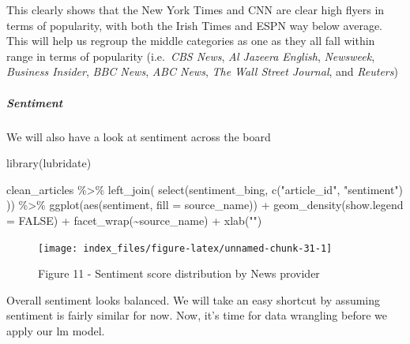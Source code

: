 \documentclass[
]{article}
\newenvironment{Shaded}{\begin{snugshade}}{\end{snugshade}}
\newcommand{\AttributeTok}[1]{\textcolor[rgb]{0.77,0.63,0.00}{#1}}
\newcommand{\ConstantTok}[1]{\textcolor[rgb]{0.00,0.00,0.00}{#1}}
\newcommand{\FunctionTok}[1]{\textcolor[rgb]{0.00,0.00,0.00}{#1}}
\newcommand{\NormalTok}[1]{#1}
\newcommand{\SpecialCharTok}[1]{\textcolor[rgb]{0.00,0.00,0.00}{#1}}
\newcommand{\StringTok}[1]{\textcolor[rgb]{0.31,0.60,0.02}{#1}}
\begin{document}
This clearly shows that the New York Times and CNN are clear high flyers
in terms of popularity, with both the Irish Times and ESPN way below
average. This will help us regroup the middle categories as one as they
all fall within range in terms of popularity (i.e.~\emph{CBS News},
\emph{Al Jazeera English}, \emph{Newsweek}, \emph{Business Insider},
\emph{BBC News}, \emph{ABC News}, \emph{The Wall Street Journal}, and
\emph{Reuters})

\hypertarget{sentiment}{%
\subparagraph{Sentiment}\label{sentiment}}

We will also have a look at sentiment across the board

\begin{Shaded}
\begin{Highlighting}[]
\FunctionTok{library}\NormalTok{(lubridate)}

\NormalTok{clean\_articles }\SpecialCharTok{\%\textgreater{}\%}
\FunctionTok{left\_join}\NormalTok{(}
           \FunctionTok{select}\NormalTok{(sentiment\_bing, }\FunctionTok{c}\NormalTok{(}\StringTok{"article\_id"}\NormalTok{, }\StringTok{"sentiment"}\NormalTok{)}
\NormalTok{                                                              )) }\SpecialCharTok{\%\textgreater{}\%}
\FunctionTok{ggplot}\NormalTok{(}\FunctionTok{aes}\NormalTok{(sentiment, }\AttributeTok{fill =}\NormalTok{ source\_name)) }\SpecialCharTok{+}
\FunctionTok{geom\_density}\NormalTok{(}\AttributeTok{show.legend =} \ConstantTok{FALSE}\NormalTok{) }\SpecialCharTok{+} 
\FunctionTok{facet\_wrap}\NormalTok{(}\SpecialCharTok{\textasciitilde{}}\NormalTok{source\_name) }\SpecialCharTok{+}
\FunctionTok{xlab}\NormalTok{(}\StringTok{""}\NormalTok{)}
\end{Highlighting}
\end{Shaded}

\begin{figure}

{\centering \texttt{[image: index\_files/figure-latex/unnamed-chunk-31-1]} 

}

\caption{Figure 11 - Sentiment score distribution by News provider}\label{fig:unnamed-chunk-31}
\end{figure}

Overall sentiment looks balanced. We will take an easy shortcut by
assuming sentiment is fairly similar for now. Now, it's time for data
wrangling before we apply our lm model.
\end{document}
